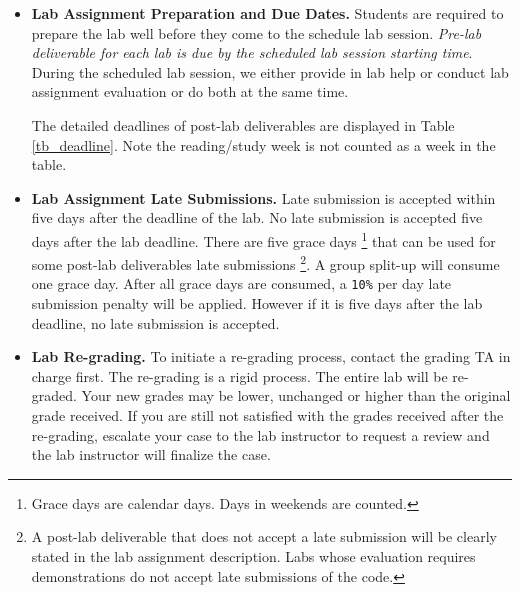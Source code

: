     \begin{itemize}
    \item {\bf Lab Assignment Preparation and Due Dates.}
        Students are required to prepare the lab well 
        before they come to the schedule lab session. 
        {\em Pre-lab deliverable for each lab is due by the scheduled lab session starting time}.
        During the scheduled lab session, we either provide 
        in lab help or conduct lab assignment evaluation 
        or do both at the same time. 
        
        The detailed deadlines of post-lab deliverables 
        are displayed in Table \ref{tb_deadline}. Note the reading/study week is not counted as a week in the table. 
        
    \item {\bf Lab Assignment Late Submissions.} 
    	Late submission is accepted within five days after the deadline of the lab. 
    	No late submission is accepted five days after the lab deadline.
    	There are five grace days \footnote{Grace days are calendar days. Days in weekends are counted.}
        that can be used for some post-lab deliverables late submissions
        \footnote{A post-lab deliverable that does not accept a late submission 
        will be clearly stated in the lab assignment description. 
        Labs whose evaluation requires demonstrations do not accept late submissions
        of the code.}. 
        A group split-up will consume one grace day. 
        After all grace days are consumed, a \verb+10%+ per day late submission penalty will be applied.
        However if it is five days after the lab deadline, no late submission is accepted. 
        
    \item {\bf Lab Re-grading.}
    	To initiate a re-grading process, contact the grading TA in charge first. The re-grading is a rigid process. The entire lab will be re-graded. Your new grades may be lower, unchanged or higher than the original grade received. If you are still not satisfied with the grades received after the re-grading, escalate your case to the lab instructor to request a review and the lab instructor will finalize the case.
    \end{itemize}
